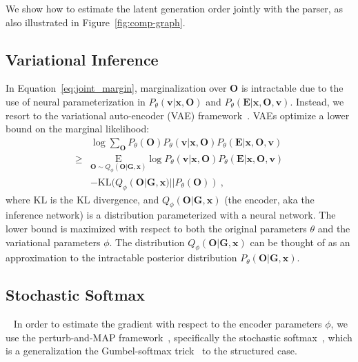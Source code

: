 \documentclass[11pt]{article}
\begin{document}
We show how to estimate the latent generation order jointly with the parser, as also illustrated in Figure~\ref{fig:comp-graph}. 


\subsection{Variational Inference}
In Equation~\ref{eq:joint_margin}, marginalization over $\mathbf{O}$ is intractable due to the use of neural parameterization in $P_\theta(\mathbf{v}|\mathbf{x},\mathbf{O})$ and $P_\theta(\mathbf{E}|\mathbf{x},\mathbf{O},\mathbf{v})$. Instead, we resort to the variational auto-encoder (VAE) framework~\cite{kingma2013auto}. VAEs optimize a lower bound on the   marginal likelihood:
\begin{align}
   &\log \sum_{\mathbf{O} } P_\theta(\mathbf{O}) P_\theta(\mathbf{v}|\mathbf{x},\mathbf{O}) P_\theta(\mathbf{E}|\mathbf{x},\mathbf{O},\mathbf{v})   \nonumber \\
    \geq & \underset{\mathbf{O} \sim Q_\phi(\mathbf{O}|\mathbf{G},\mathbf{x}) }{\mathrm{E}} \log P_\theta(\mathbf{v}|\mathbf{x},\mathbf{O})P_\theta(\mathbf{E}|\mathbf{x},\mathbf{O},\mathbf{v}) \nonumber \\
    &- \mathrm{KL}(Q_\phi(\mathbf{O}|\mathbf{G},\mathbf{x})|| P_\theta(\mathbf{O})) ~\label{eq:elbo},
\end{align}
where $\mathrm{KL}$ is the  KL divergence, and  $Q_\phi(\mathbf{O}|\mathbf{G},\mathbf{x})$ (the encoder, aka the inference network) is a distribution parameterized with a neural network. The lower bound is maximized with respect to both the original parameters $\theta$ and the variational parameters $\phi$. The distribution $Q_\phi(\mathbf{O}|\mathbf{G},\mathbf{x})$ can be thought of as an approximation to the intractable posterior distribution
$P_\theta(\mathbf{O}|\mathbf{G},\mathbf{x})$.


\subsection{Stochastic Softmax}~\label{sec:soft}
In order to estimate the gradient
with respect to the encoder parameters $\phi$,
we use the perturb-and-MAP framework~\cite{Papandreou2011PerturbandMAPRF,hazan2012partition},
specifically the stochastic softmax~\cite{Paulus2020GradientEW}, which is
 a generalization the Gumbel-softmax trick~\cite{Jang2016CategoricalRW,Maddison2017TheCD} to the structured case.
\end{document}
